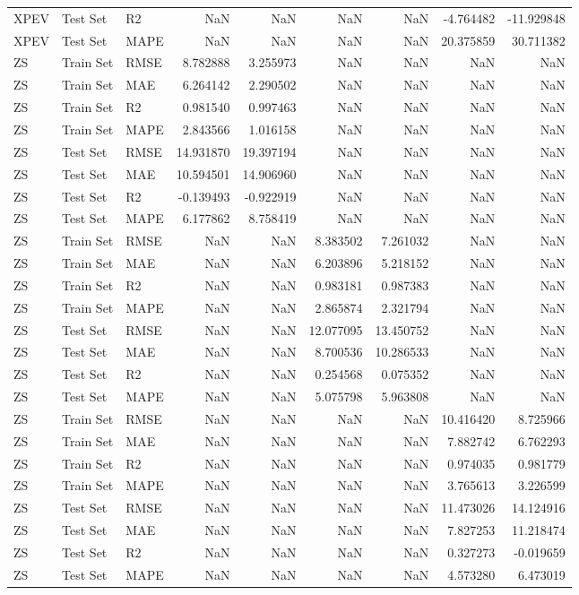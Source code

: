 \begin{tabular}{lllrrrrrr}
XPEV & Test Set & R2 & NaN & NaN & NaN & NaN & -4.764482 & -11.929848 \\
XPEV & Test Set & MAPE & NaN & NaN & NaN & NaN & 20.375859 & 30.711382 \\
ZS & Train Set & RMSE & 8.782888 & 3.255973 & NaN & NaN & NaN & NaN \\
ZS & Train Set & MAE & 6.264142 & 2.290502 & NaN & NaN & NaN & NaN \\
ZS & Train Set & R2 & 0.981540 & 0.997463 & NaN & NaN & NaN & NaN \\
ZS & Train Set & MAPE & 2.843566 & 1.016158 & NaN & NaN & NaN & NaN \\
ZS & Test Set & RMSE & 14.931870 & 19.397194 & NaN & NaN & NaN & NaN \\
ZS & Test Set & MAE & 10.594501 & 14.906960 & NaN & NaN & NaN & NaN \\
ZS & Test Set & R2 & -0.139493 & -0.922919 & NaN & NaN & NaN & NaN \\
ZS & Test Set & MAPE & 6.177862 & 8.758419 & NaN & NaN & NaN & NaN \\
ZS & Train Set & RMSE & NaN & NaN & 8.383502 & 7.261032 & NaN & NaN \\
ZS & Train Set & MAE & NaN & NaN & 6.203896 & 5.218152 & NaN & NaN \\
ZS & Train Set & R2 & NaN & NaN & 0.983181 & 0.987383 & NaN & NaN \\
ZS & Train Set & MAPE & NaN & NaN & 2.865874 & 2.321794 & NaN & NaN \\
ZS & Test Set & RMSE & NaN & NaN & 12.077095 & 13.450752 & NaN & NaN \\
ZS & Test Set & MAE & NaN & NaN & 8.700536 & 10.286533 & NaN & NaN \\
ZS & Test Set & R2 & NaN & NaN & 0.254568 & 0.075352 & NaN & NaN \\
ZS & Test Set & MAPE & NaN & NaN & 5.075798 & 5.963808 & NaN & NaN \\
ZS & Train Set & RMSE & NaN & NaN & NaN & NaN & 10.416420 & 8.725966 \\
ZS & Train Set & MAE & NaN & NaN & NaN & NaN & 7.882742 & 6.762293 \\
ZS & Train Set & R2 & NaN & NaN & NaN & NaN & 0.974035 & 0.981779 \\
ZS & Train Set & MAPE & NaN & NaN & NaN & NaN & 3.765613 & 3.226599 \\
ZS & Test Set & RMSE & NaN & NaN & NaN & NaN & 11.473026 & 14.124916 \\
ZS & Test Set & MAE & NaN & NaN & NaN & NaN & 7.827253 & 11.218474 \\
ZS & Test Set & R2 & NaN & NaN & NaN & NaN & 0.327273 & -0.019659 \\
ZS & Test Set & MAPE & NaN & NaN & NaN & NaN & 4.573280 & 6.473019 \\
\bottomrule
\end{tabular}
